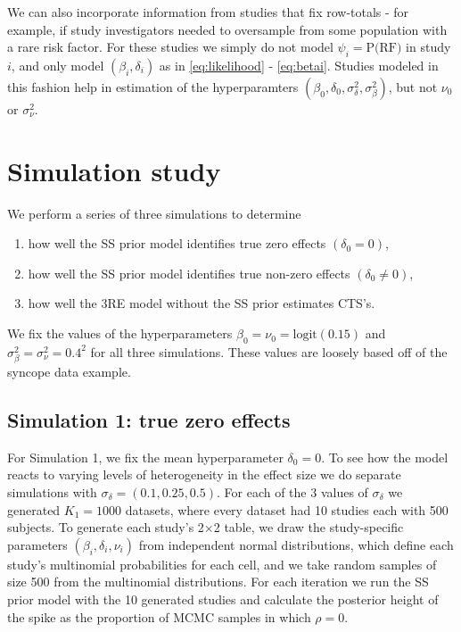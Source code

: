 \documentclass[AMA,STIX1COL]{WileyNJD-v2}
\begin{document}
We can also incorporate information from studies that fix row-totals - for example, if study investigators needed to oversample from some population with a rare risk factor. For these studies we simply do not model $\psi_i = \mbox{P(RF)}$ in study $i$, and only model $(\beta_i, \delta_i)$ as in \eqref{eq:likelihood} - \eqref{eq:betai}. Studies modeled in this fashion help in estimation of the hyperparamters $(\beta_0, \delta_0, \sigma^2_\delta, \sigma^2_\beta)$, but not $\nu_0$ or $\sigma^2_\nu$.

\section{Simulation study} \label{sec:simulation}

We perform a series of three simulations to determine 
\begin{enumerate}
\item{how well the SS prior model identifies true zero effects $(\delta_0 = 0)$,}
\item{how well the SS prior model identifies true non-zero effects $(\delta_0 \ne 0)$,}
\item{how well the 3RE model without the SS prior estimates CTS's.}
\end{enumerate}
\noindent We fix the values of the hyperparameters $\beta_0 = \nu_0 = \mbox{logit}(0.15)$ and $\sigma_\beta^2 = \sigma_\nu^2 = 0.4^2$ for all three simulations. These values are loosely based off of the syncope data example. 

\subsection{Simulation 1: true zero effects} \label{sec:sim_zero}

For Simulation 1, we fix the mean hyperparameter $\delta_0 = 0$. To see how the model reacts to varying levels of heterogeneity in the effect size we do separate simulations with $\sigma_\delta = (0.1, 0.25, 0.5)$. For each of the 3 values of $\sigma_\delta$ we generated $K_1 = 1000$ datasets, where every dataset had 10 studies each with 500 subjects. To generate each study's 2$\times$2 table, we draw the study-specific parameters $(\beta_i, \delta_i, \nu_i)$ from independent normal distributions, which define each study's multinomial probabilities for each cell, and we take random samples of size 500 from the multinomial distributions. For each iteration we run the SS prior model with the 10 generated studies and calculate the posterior height of the spike as the proportion of MCMC samples in which $\rho = 0$. 
\end{document}
